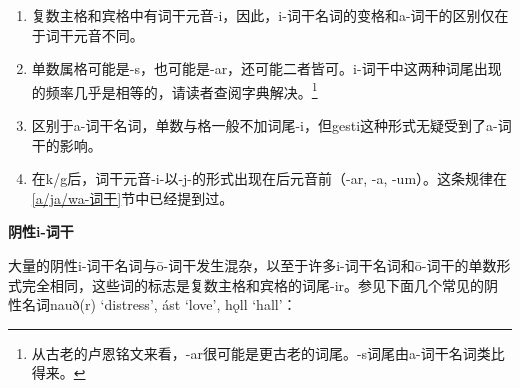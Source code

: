 \begin{enumerate}
  \def\labelenumi{\arabic{enumi})}
  \item
        复数主格和宾格中有词干元音-i，因此，i-词干名词的变格和a-词干的区别仅在于词干元音不同。
  \item
        单数属格可能是-s，也可能是-ar，还可能二者皆可。i-词干中这两种词尾出现的频率几乎是相等的，请读者查阅字典解决。\footnote{从古老的卢恩铭文来看，-ar很可能是更古老的词尾。-s词尾由a-词干名词类比得来。}
  \item
        区别于a-词干名词，单数与格一般不加词尾-i，但gesti这种形式无疑受到了a-词干的影响。
  \item
        在k/g后，词干元音-i-以-j-的形式出现在后元音前（-ar, -a,
        -um）。这条规律在\ref{a/ja/wa-词干}节中已经提到过。
\end{enumerate}

\textbf{阴性i-词干}

大量的阴性i-词干名词与ō-词干发生混杂，以至于许多i-词干名词和ō-词干的单数形式完全相同，这些词的标志是复数主格和宾格的词尾-ir。参见下面几个常见的阴性名词nauð(r)
`distress', ást `love', hǫll `hall'：

